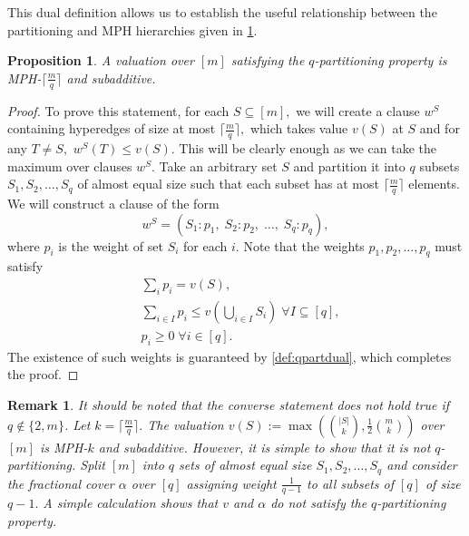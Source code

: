 \documentclass[11pt]{article}%
\newtheorem{remark}[theorem]{Remark}
\newtheorem{proposition}[theorem]{Proposition}
\numberwithin{theorem}{subsection}
\begin{document}
\noindent
This dual definition allows us to establish the useful relationship between the partitioning and MPH hierarchies given in \cref{lem:qpartandmphk}.


\begin{proposition}
\label{lem:qpartandmphk}
A valuation over $[m]$ satisfying the $q$-partitioning property is MPH-$\lceil \frac{m}{q}\rceil$ and subadditive.\end{proposition}

\begin{proof}
To prove this statement, for each $S\subseteq [m],$ we will create a clause $w^S$ containing hyperedges of size at most $\lceil \frac{m}{q}\rceil,$ which takes value $v(S)$ at $S$ and for any $T\neq S,$ $w^S(T)\le v(S).$ This will be clearly enough as we can take the maximum over clauses $w^S.$
Take an arbitrary set $S$ and partition it into $q$ subsets $S_1,S_2, \ldots, S_q$ of almost equal size such that each subset has at most $\lceil \frac{m}{q}\rceil$ elements.  We will construct a clause of the form
$$
w^S = (S_1: p_1, \; S_2 : p_2,\;  \ldots, \; S_q:p_q ),
$$
where $p_i$ is the weight of set $S_i$ for each $i.$ Note that the weights $p_1, p_2, \ldots, p_q$ must satisfy
\begin{equation*}
    \begin{split}
        & \sum_i p_i = v(S),\\
        & \sum_{i \in I} p_i \le v(\bigcup_{i \in I}S_i)\; \forall
I\subseteq [q],\\
    & p_i\ge 0\; \forall i\in [q].
    \end{split}
\end{equation*}
The existence of such weights is guaranteed by \cref{def:qpartdual}, which completes the proof.\end{proof}

\begin{remark}
\normalfont
It should be noted that the converse statement does not hold true if $q\not \in \{2,m\}$. Let $k = \lceil \frac{m}{q}\rceil.$ The valuation $v(S):= \max\left( \binom{|S|}{k}, \frac{1}{2}\binom{m}{k}\right)$ over $[m]$ is MPH-$k$ and subadditive. However, it is simple to show that it is not $q$-partitioning. Split $[m]$ into $q$ sets of almost equal size $S_1, S_2, \ldots, S_q$ and consider the fractional cover $\alpha$ over $[q]$ assigning weight $\frac{1}{q-1}$ to all subsets of $[q]$ of size $q-1.$ A simple calculation shows that $v$ and $\alpha$ do not satisfy the $q$-partitioning property.
\end{remark}
\end{document}
